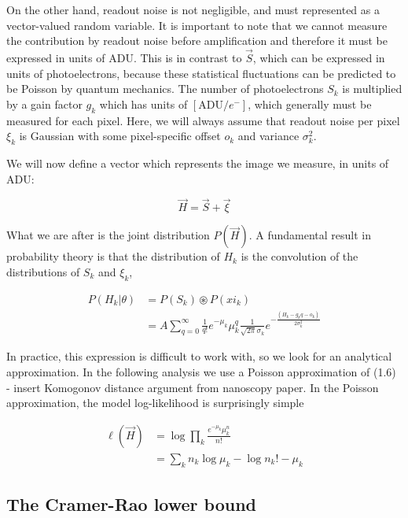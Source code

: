 \documentclass{ucetd}
\begin{document}
On the other hand, readout noise is not negligible, and must represented as a vector-valued random variable. It is important to note that we cannot measure the contribution by readout noise before amplification and therefore it must be expressed in units of $\mathrm{ADU}$. This is in contrast to $\vec{S}$, which can be expressed in units of photoelectrons, because these statistical fluctuations can be predicted to be Poisson by quantum mechanics. The number of photoelectrons $S_{k}$ is  multiplied by a gain factor $g_{k}$ which has units of $[\mathrm{ADU}/e^{-}]$, which generally must be measured for each pixel. Here, we will always assume that readout noise per pixel $\xi_{k}$ is Gaussian with some pixel-specific offset $o_{k}$ and variance $\sigma_{k}^{2}$. 

We will now define a vector which represents the image we measure, in units of ADU: 

\begin{equation}
\vec{H} = \vec{S} + \vec{\xi}
\end{equation}

What we are after is the joint distribution $P(\vec{H})$. A fundamental result in probability theory is that the distribution of $H_{k}$ is the convolution of the distributions of $S_{k}$ and $\xi_{k}$,

\begin{align*}
P(H_{k}|\theta) &= P(S_{k})\circledast P(xi_{k})\\
&= A\sum_{q=0}^{\infty} \frac{1}{q!}e^{-\mu_{k}}\mu_{k}^{q}\frac{1}{\sqrt{2\pi}\sigma_{k}}e^{-\frac{(H_{k}-g_{k}q-o_{k})}{2\sigma_{k}^{2}}}
\end{align*}

In practice, this expression is difficult to work with, so we look for an analytical approximation. In the following analysis we use a Poisson approximation of (1.6) - insert Komogonov distance argument from nanoscopy paper. In the Poisson approximation, the model log-likelihood is surprisingly simple

\begin{align*}
\ell(\vec{H}) &= \log \prod_{k} \frac{e^{-\mu_{k}}\mu_{k}^{n}}{n!}\\
&= \sum_{k} n_{k}\log\mu_{k} - \log n_{k}! - \mu_{k}
\end{align*}


\subsection{The Cramer-Rao lower bound}
\end{document}

